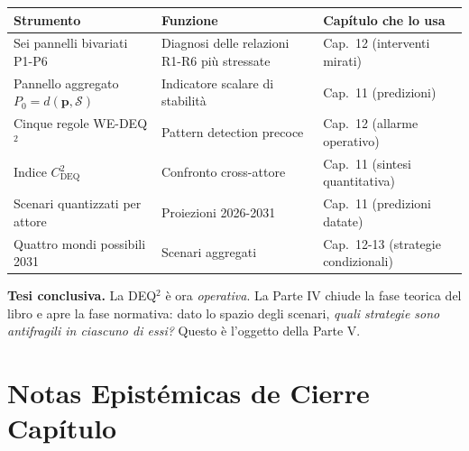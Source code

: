 {\def\LTcaptype{none} %
{\small\begin{longtable}[]{@{}
  >{\raggedright\arraybackslash}p{}
  >{\raggedright\arraybackslash}p{}
  >{\raggedright\arraybackslash}p{}@{}}
\toprule\noalign{}
\begin{minipage}[b]{\linewidth}\raggedright
Strumento
\end{minipage} & \begin{minipage}[b]{\linewidth}\raggedright
Funzione
\end{minipage} & \begin{minipage}[b]{\linewidth}\raggedright
Capítulo che lo usa
\end{minipage} \\
\midrule\noalign{}
\endhead
\bottomrule\noalign{}
\endlastfoot
Sei pannelli bivariati P1-P6 & Diagnosi delle relazioni R1-R6 più
stressate & Cap.~12 (interventi mirati) \\
Pannello aggregato \(P_0 = d(\boldsymbol{p}, \mathcal{S})\) & Indicatore
scalare di stabilità & Cap.~11 (predizioni) \\
Cinque regole WE-DEQ$^2$ & Pattern detection precoce & Cap.~12 (allarme
operativo) \\
Indice \(C_{\text{DEQ}}^2\) & Confronto cross-attore & Cap.~11 (sintesi
quantitativa) \\
Scenari quantizzati per attore & Proiezioni 2026-2031 & Cap.~11
(predizioni datate) \\
Quattro mondi possibili 2031 & Scenari aggregati & Cap.~12-13 (strategie
condizionali) \\
\end{longtable}}
}

\Hypoth{} \textbf{Tesi conclusiva.} La DEQ$^2$ è ora \emph{operativa}. La
Parte IV chiude la fase teorica del libro e apre la fase normativa: dato
lo spazio degli scenari, \emph{quali strategie sono antifragili in
ciascuno di essi?} Questo è l'oggetto della Parte V.



\section{Notas Epistémicas de Cierre
Capítulo}\label{note-epistemiche-di-chiusura-capítulo}

